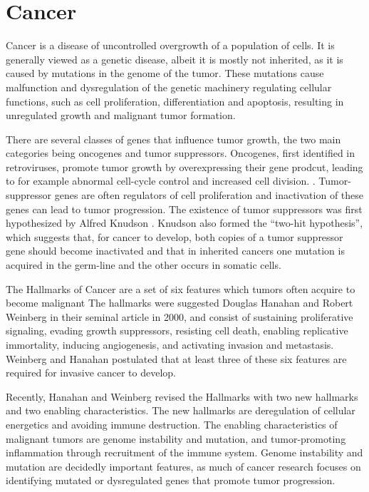 
\section{Cancer}\label{cancer}

Cancer is a disease of uncontrolled overgrowth of a population of cells. It is
generally viewed as a genetic disease, albeit it is mostly not inherited, as it is
caused by  mutations in the genome of the tumor. These mutations cause malfunction
and dysregulation of the genetic machinery regulating cellular functions, such
as cell proliferation, differentiation and apoptosis, resulting in
unregulated growth and malignant tumor formation.

There are several classes of genes that influence tumor growth, the two main
categories being oncogenes and tumor suppressors. Oncogenes, first
identified in retroviruses,
promote tumor growth by overexpressing their gene prodcut, leading to for
example abnormal cell-cycle control and increased cell division.
\citep{Varmus1988}. Tumor-suppressor genes are often regulators of cell
proliferation and
inactivation of these genes can lead to tumor progression. The existence of
tumor suppressors was first hypothesized by Alfred Knudson \citep{Knudson1971}.
Knudson also formed the “two-hit hypothesis”, which
suggests that, for cancer to develop, both copies of
a tumor suppressor gene should become inactivated and that in inherited
cancers one mutation is acquired in the germ-line and the other occurs in
somatic cells.

The Hallmarks of Cancer are a set of
six features which tumors often acquire to become malignant
The hallmarks were suggested Douglas Hanahan and Robert Weinberg \citep{Hanahan2000} in
their seminal article in 2000, and consist of
sustaining proliferative signaling, evading growth suppressors, resisting cell
death, enabling replicative immortality, inducing angiogenesis, and activating
invasion and metastasis. Weinberg and Hanahan postulated that at least three
of these six features are required for invasive cancer to develop.

Recently, Hanahan and Weinberg \citep{Hanahan2011} revised the Hallmarks with two new
hallmarks and two enabling characteristics. The new
hallmarks are deregulation of cellular energetics and avoiding immune
destruction. The enabling characteristics of malignant tumors are genome
instability and mutation, and tumor-promoting inflammation through recruitment
of the immune system. Genome instability and mutation are decidedly important
features, as much of cancer research focuses on identifying mutated or
dysregulated genes that promote tumor progression.




